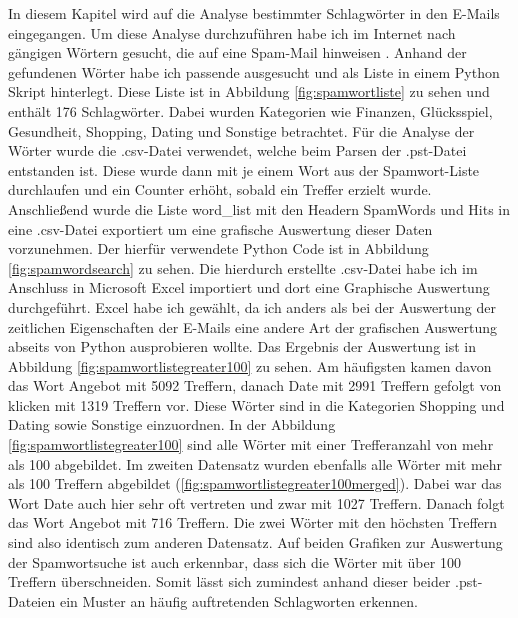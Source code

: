 In diesem Kapitel wird auf die Analyse bestimmter Schlagwörter in den E-Mails eingegangen. Um diese Analyse durchzuführen habe ich im Internet nach gängigen Wörtern gesucht, die auf eine Spam-Mail hinweisen \cite{Heise.07.06.2021}. Anhand der gefundenen Wörter habe ich passende ausgesucht und als Liste in einem Python Skript hinterlegt. Diese Liste ist in Abbildung \ref{fig:spamwortliste} zu sehen und enthält 176 Schlagwörter. Dabei wurden Kategorien wie Finanzen, Glücksspiel, Gesundheit, Shopping, Dating und Sonstige betrachtet. Für die Analyse der Wörter wurde die .csv-Datei verwendet, welche beim Parsen der .pst-Datei entstanden ist. Diese wurde dann mit je einem Wort aus der Spamwort-Liste durchlaufen und ein Counter erhöht, sobald ein Treffer erzielt wurde. Anschließend wurde die Liste \glqq{}word\_list\grqq{} mit den Headern \glqq{}SpamWords\grqq{} und \glqq{}Hits\grqq{} in eine .csv-Datei exportiert um eine grafische Auswertung dieser Daten vorzunehmen. Der hierfür verwendete Python Code ist in Abbildung \ref{fig:spamwordsearch} zu sehen. Die hierdurch erstellte .csv-Datei habe ich im Anschluss in Microsoft Excel importiert und dort eine Graphische Auswertung durchgeführt. Excel habe ich gewählt, da ich anders als bei der Auswertung der zeitlichen Eigenschaften der E-Mails eine andere Art der grafischen Auswertung abseits von Python ausprobieren wollte. \newline
Das Ergebnis der Auswertung ist in Abbildung \ref{fig:spamwortlistegreater100} zu sehen. Am häufigsten kamen davon das Wort \glqq{}Angebot\grqq{} mit 5092 Treffern, danach \glqq{}Date\grqq{} mit 2991 Treffern gefolgt von \glqq{}klicken\grqq{} mit 1319 Treffern vor. Diese Wörter sind in die Kategorien Shopping und Dating sowie Sonstige einzuordnen. In der Abbildung \ref{fig:spamwortlistegreater100} sind alle Wörter mit einer Trefferanzahl von mehr als 100 abgebildet. \newline 
Im zweiten Datensatz wurden ebenfalls alle Wörter mit mehr als 100 Treffern abgebildet (\ref{fig:spamwortlistegreater100merged}). Dabei war das Wort \glqq{}Date\grqq{} auch hier sehr oft vertreten und zwar mit 1027 Treffern. Danach folgt das Wort \glqq{}Angebot\grqq{} mit 716 Treffern. Die zwei Wörter mit den höchsten Treffern sind also identisch zum anderen Datensatz. Auf beiden Grafiken zur Auswertung der Spamwortsuche ist auch erkennbar, dass sich die Wörter mit über 100 Treffern überschneiden. Somit lässt sich zumindest anhand dieser beider .pst-Dateien ein Muster an häufig auftretenden Schlagworten erkennen. 

